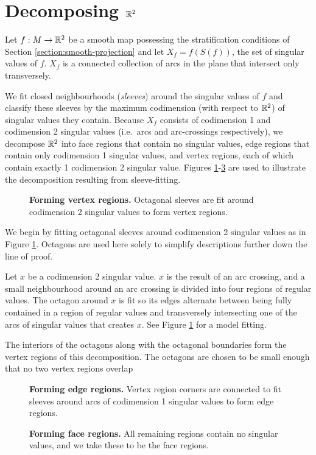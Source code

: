\section{Decomposing $\mathbb{R}^2$}

Let $f:M\to\mathbb{R}^2$ be a smooth map possessing the stratification conditions of Section \ref{section:smooth-projection} and let $X_f = f(S(f))$, the set of singular values of $f$.
$X_f$ is a connected collection of arcs in the plane that intersect only transversely.

We fit closed neighbourhoods (\emph{sleeves}) around the singular values of $f$ and classify these sleeves by the maximum codimension (with respect to $\mathbb{R}^2$) of singular values they contain.
Because $X_f$ consists of codimension 1 and codimension 2 singular values (i.e.\ arcs and arc-crossings respectively), we decompose $\mathbb{R}^2$ into face regions that contain no singular values, edge regions that contain only codimension 1 singular values, and vertex regions, each of which contain exactly 1 codimension 2 singular value.
Figures \ref{fig:vertex-sleeve}-\ref{fig:face-sleeve} are used to illustrate the decomposition resulting from sleeve-fitting.

\begin{figure}[h!]
	\label{fig:vertex-sleeve}
	\caption{
		\textbf{Forming vertex regions.}
		Octagonal sleeves are fit around codimension 2 singular values to form vertex regions.
	}
\end{figure}

We begin by fitting octagonal sleeves around codimension 2 singular values as in Figure \ref{fig:vertex-sleeve}.
Octagons are used here solely to simplify descriptions further down the line of proof.

Let $x$ be a codimension 2 singular value.
$x$ is the result of an arc crossing, and a small neighbourhood around an arc crossing is divided into four regions of regular values.
The octagon around $x$ is fit so its edges alternate between being fully contained in a region of regular values and transversely intersecting one of the arcs of singular values that creates $x$.
See Figure \ref{fig:vertex-sleeve} for a model fitting.

The interiors of the octagons along with the octagonal boundaries form the vertex regions of this decomposition.
The octagons are chosen to be small enough that no two vertex regions overlap

\begin{figure}[h!]
	\label{fig:edge-sleeve}
	\caption{
		\textbf{Forming edge regions.}
		Vertex region corners are connected to fit sleeves around arcs of codimension 1 singular values to form edge regions.
	}
\end{figure}



\begin{figure}[h!]
	\label{fig:face-sleeve}
	\caption{
		\textbf{Forming face regions.}
		All remaining regions contain no singular values, and we take these to be the face regions.
	}
\end{figure}
